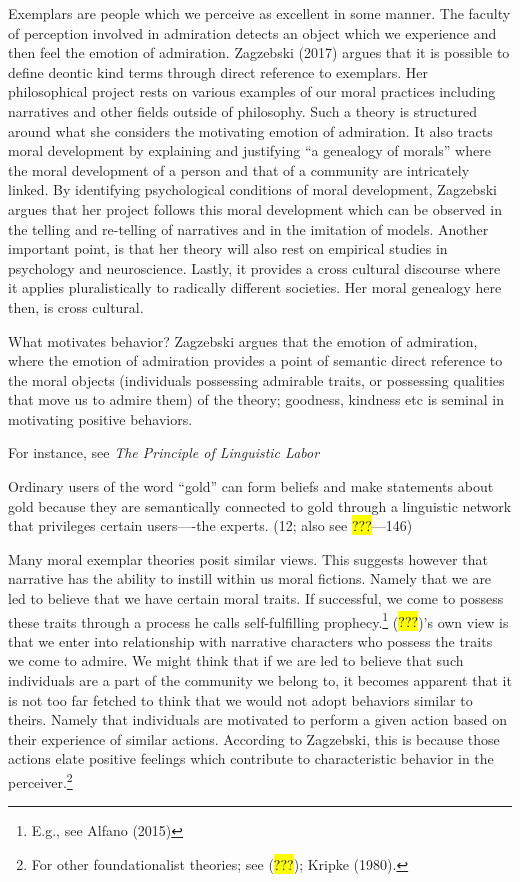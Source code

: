\documentclass[
  letterpaper,
  DIV=11,
  numbers=noendperiod]{scrartcl}
\theoremstyle{remark}
\begin{document}
Exemplars are people which we perceive as excellent in some manner. The
faculty of perception involved in admiration detects an object which we
experience and then feel the emotion of admiration. Zagzebski (2017)
argues that it is possible to define deontic kind terms through direct
reference to exemplars. Her philosophical project rests on various
examples of our moral practices including narratives and other fields
outside of philosophy. Such a theory is structured around what she
considers the motivating emotion of admiration. It also tracts moral
development by explaining and justifying ``a genealogy of morals'' where
the moral development of a person and that of a community are
intricately linked. By identifying psychological conditions of moral
development, Zagzebski argues that her project follows this moral
development which can be observed in the telling and re-telling of
narratives and in the imitation of models. Another important point, is
that her theory will also rest on empirical studies in psychology and
neuroscience. Lastly, it provides a cross cultural discourse where it
applies pluralistically to radically different societies. Her moral
genealogy here then, is cross cultural.

What motivates behavior? Zagzebski argues that the emotion of
admiration, where the emotion of admiration provides a point of semantic
direct reference to the moral objects (individuals possessing admirable
traits, or possessing qualities that move us to admire them) of the
theory; goodness, kindness etc is seminal in motivating positive
behaviors.

For instance, see \emph{The Principle of Linguistic Labor}

Ordinary users of the word ``gold'' can form beliefs and make statements
about gold because they are semantically connected to gold through a
linguistic network that privileges certain users----the experts. (12;
also see \hl{???}---146)

Many moral exemplar theories posit similar views. This suggests however
that narrative has the ability to instill within us moral fictions.
Namely that we are led to believe that we have certain moral traits. If
successful, we come to possess these traits through a process he calls
self-fulfilling prophecy.\footnote{E.g., see Alfano (2015)} (\hl{???})'s
own view is that we enter into relationship with narrative characters
who possess the traits we come to admire. We might think that if we are
led to believe that such individuals are a part of the community we
belong to, it becomes apparent that it is not too far fetched to think
that we would not adopt behaviors similar to theirs. Namely that
individuals are motivated to perform a given action based on their
experience of similar actions. According to Zagzebski, this is because
those actions elate positive feelings which contribute to characteristic
behavior in the perceiver.\footnote{For other foundationalist theories;
  see (\hl{???}); Kripke (1980).}
\end{document}
